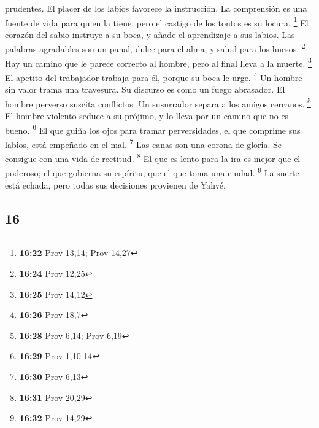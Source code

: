 \begin{paracol}{2}
prudentes. El placer de los labios favorece la instrucción.
 La comprensión es una fuente de vida para quien la
tiene, pero el castigo de los tontos es su locura. \footnote{\textbf{16:22}
  Prov 13,14; Prov 14,27}  El corazón del sabio instruye
a su boca, y añade el aprendizaje a sus labios.  Las
palabras agradables son un panal, dulce para el alma, y salud para los
huesos. \footnote{\textbf{16:24} Prov 12,25}  Hay un
camino que le parece correcto al hombre, pero al final lleva a la
muerte. \footnote{\textbf{16:25} Prov 14,12}  El apetito
del trabajador trabaja para él, porque su boca le urge. \footnote{\textbf{16:26}
  Prov 18,7}  Un hombre sin valor trama una travesura. Su
discurso es como un fuego abrasador.  El hombre perverso
suscita conflictos. Un susurrador separa a los amigos cercanos.
\footnote{\textbf{16:28} Prov 6,14; Prov 6,19}  El hombre
violento seduce a su prójimo, y lo lleva por un camino que no es bueno.
\footnote{\textbf{16:29} Prov 1,10-14}  El que guiña los
ojos para tramar perversidades, el que comprime sus labios, está
empeñado en el mal. \footnote{\textbf{16:30} Prov 6,13} 
Las canas son una corona de gloria. Se consigue con una vida de
rectitud. \footnote{\textbf{16:31} Prov 20,29}  El que es
lento para la ira es mejor que el poderoso; el que gobierna su espíritu,
que el que toma una ciudad. \footnote{\textbf{16:32} Prov 14,29}
 La suerte está echada, pero todas sus decisiones
provienen de Yahvé.

\switchcolumn
\begin{otherlanguage}{english}

\hypertarget{section-31}{%
\section{16}\label{section-31}}


\end{otherlanguage}
\end{paracol}
